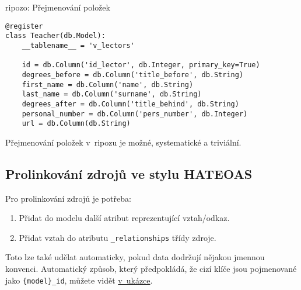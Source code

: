 \begin{listing}[htbp]
\caption{{\label{code:ripozo:rename}ripozo: Přejmenování položek}}
\begin{verbatim}
@register
class Teacher(db.Model):
    __tablename__ = 'v_lectors'

    id = db.Column('id_lector', db.Integer, primary_key=True)
    degrees_before = db.Column('title_before', db.String)
    first_name = db.Column('name', db.String)
    last_name = db.Column('surname', db.String)
    degrees_after = db.Column('title_behind', db.String)
    personal_number = db.Column('pers_number', db.Integer)
    url = db.Column(db.String)
\end{verbatim}
\end{listing}

Přejmenování položek v~ripozu je možné, systematické a triviální.

\subsection{Prolinkování zdrojů ve stylu HATEOAS}\label{prolinkovuxe1nuxed-zdrojux16f-ve-stylu-hateoas}

Pro prolinkování zdrojů je potřeba:

\begin{enumerate}
\def\labelenumi{\arabic{enumi}.}
\tightlist
\item
  Přidat do modelu další atribut reprezentující vztah/odkaz.
\item
  Přidat vztah do atributu \verb!_relationships! třídy zdroje.
\end{enumerate}

Toto lze také udělat automaticky, pokud data dodržují nějakou jmennou konvenci. Automatický způsob, který předpokládá, že cizí klíče jsou pojmenované jako \verb!{model}_id!, můžete vidět \protect\hyperlink{code:ripozo:links}{v~ukázce}.


